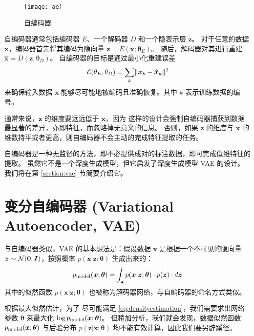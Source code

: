 \begin{figure}[h]
	\centering%
	{\texttt{[image: ae]}}
	\caption{自编码器}\label{fig:ae}
\end{figure}

自编码器通常包括编码器 $E$、一个解码器 $D$ 和一个隐表示层 $\bm z$。
对于任意的数据 $\bm x$，编码器首先将其编码为隐向量 $\bm z = E(\bm x; \bm\theta_E)$。
随后，解码器对其进行重建 $\bm {\hat x} = D(\bm z; \bm\theta_D)$。
自编码器的目标是通过最小化重建误差
\begin{align}
	\mathcal{L}(\theta_E, \theta_D) = \sum_k \lVert\bm  x_k - \bm {\hat x}_k\rVert^2 \label{eq:aeloss}
\end{align}
来确保输入数据 $\bm x$ 能够尽可能地被编码且准确恢复。其中 $k$ 表示训练数据的编号。

通常来说，$\bm z$ 的维度要远远低于 $\bm x$，因为
这样的设计会强制自编码器捕获到数据最显著的差异，亦即特征，而忽略掉无意义的信息。
否则，如果 $\bm z$ 的维度与 $\bm x$ 的维数持平或者更高，则自编码器不会主动的完成特征提取的任务。

自编码器是一种无监督的方法，即不必提供成对的标注数据，即可完成低维特征的提取。
虽然它不是一个深度生成模型，但它启发了深度生成模型 VAE 的设计。
我们将在第 \ref{section:vae} 节简要介绍它。

















\section{变分自编码器 (Variational Autoencoder, VAE) \label{section:vae}}
与自编码器类似，VAE\cite{vae} 的基本想法是：假设数据 $\bm x $ 是根据一个不可见的隐向量 $\bm z \sim \mathcal{N}(\bm 0, \bm I)$，按照概率 $p(\bm x | \bm z; \bm \theta)$ 生成出来的：
\begin{align}
	p_{\mathrm {model}}(\bm x; \bm\theta) = \int_{\bm z} p(\bm x | \bm z; \bm\theta) \cdot p(\bm z) \cdot d\bm{z} \label{eq:vaepmodel}
\end{align}
其中的似然函数 $p(\bm x | \bm z; \bm\theta)$ 也被称为解码器网络，与自编码器的命名方式类似。


根据最大似然估计，为了%
尽可能满足 \eqref{eq:densityestimation}，我们需要求出网络参数 $\bm\theta$ 来最大化 $\log p_{\mathrm {model}}(\bm x; \bm\theta)$。
但稍加分析，我们就会发现，数据似然函数 $p_{\mathrm {model}}(\bm x; \bm\theta)$ 与后验分布 $p(\bm z | \bm x; \bm\theta)$ 均不能有效计算，因此我们要另辟蹊径。

